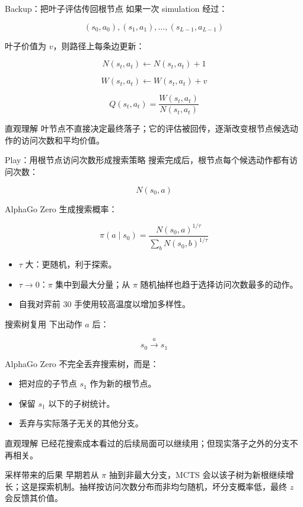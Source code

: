 \documentclass[UTF8,aspectratio=169,10pt]{ctexbeamer}
\begin{document}
\begin{frame}{Backup：把叶子评估传回根节点}
  如果一次 simulation 经过：

  \[
    (s_0,a_0),(s_1,a_1),\ldots,(s_{L-1},a_{L-1})
  \]

  叶子价值为 $v$，则路径上每条边更新：

  \[
    N(s_t,a_t) \leftarrow N(s_t,a_t)+1
  \]

  \[
    W(s_t,a_t) \leftarrow W(s_t,a_t)+v
  \]

  \[
    Q(s_t,a_t)=\frac{W(s_t,a_t)}{N(s_t,a_t)}
  \]

  \begin{block}{直观理解}
    叶节点不直接决定最终落子；它的评估被回传，逐渐改变根节点候选动作的访问次数和平均价值。
  \end{block}
\end{frame}

\begin{frame}{Play：用根节点访问次数形成搜索策略}
  搜索完成后，根节点每个候选动作都有访问次数：

  \[
    N(s_0,a)
  \]

  AlphaGo Zero 生成搜索概率：

  \[
    \pi(a\mid s_0)=
    \frac{N(s_0,a)^{1/\tau}}{\sum_b N(s_0,b)^{1/\tau}}
  \]

  \begin{itemize}
    \item $\tau$ 大：更随机，利于探索。
    \item $\tau \to 0$：$\pi$ 集中到最大分量；从 $\pi$ 随机抽样也趋于选择访问次数最多的动作。
    \item 自我对弈前 30 手使用较高温度以增加多样性。
  \end{itemize}
\end{frame}

\begin{frame}{搜索树复用}
  \small
  下出动作 $a$ 后：

  \[
    s_0 \xrightarrow{a} s_1
  \]

  AlphaGo Zero 不完全丢弃搜索树，而是：

  \begin{itemize}
    \item 把对应的子节点 $s_1$ 作为新的根节点。
    \item 保留 $s_1$ 以下的子树统计。
    \item 丢弃与实际落子无关的其他分支。
  \end{itemize}

  \begin{block}{直观理解}
    已经花搜索成本看过的后续局面可以继续用；但现实落子之外的分支不再相关。
  \end{block}

  \begin{alertblock}{采样带来的后果}
    早期若从 $\pi$ 抽到非最大分支，MCTS 会以该子树为新根继续增长；这是探索机制。抽样按访问次数分布而非均匀随机，坏分支概率低，最终 $z$ 会反馈其价值。
  \end{alertblock}
\end{frame}
\end{document}
